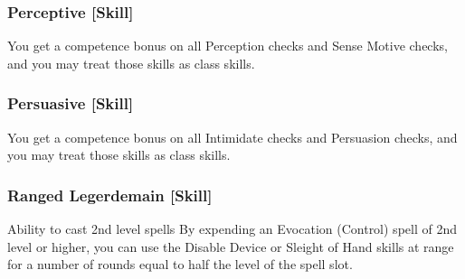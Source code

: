 \subsubsection{Perceptive [Skill]}
 You get a  competence bonus on all Perception checks and Sense Motive checks, and you may treat those skills as class skills.

\subsubsection{Persuasive [Skill]}
 You get a  competence bonus on all Intimidate checks and Persuasion checks, and you may treat those skills as class skills.

\subsubsection{Ranged Legerdemain [Skill]}
 Ability to cast 2nd level spells
 By expending an Evocation (Control) spell of 2nd level or higher, you can use the Disable Device or Sleight of Hand skills at \rngclose range for a number of rounds equal to half the level of the spell slot.

